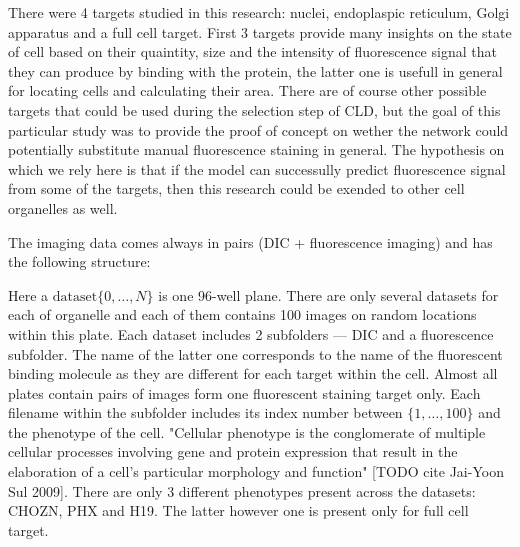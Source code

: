 There were 4 targets studied in this research: nuclei, endoplaspic reticulum, Golgi apparatus and a full cell target. First 3 targets provide many insights on the state of cell based on their quaintity, size and the intensity of fluorescence signal that they can produce by binding with the protein, the latter one is usefull in general for locating cells and calculating their area. There are of course other possible targets that could be used during the selection step of CLD, but the goal of this particular study was to provide the proof of concept on wether the network could potentially substitute manual fluorescence staining in general. The hypothesis on which we rely here is that if the model can successully predict fluorescence signal from some of the targets, then this research could be exended to other cell organelles as well.

The imaging data comes always in pairs (DIC + fluorescence imaging) and has the following structure:



Here a $\text{dataset}\{0, \ldots, N\}$ is one 96-well plane. There are only several datasets for each of organelle and each of them contains 100 images on random locations within this plate. Each dataset includes 2 subfolders --- DIC and a fluorescence subfolder. The name of the latter one corresponds to the name of the fluorescent binding molecule as they are different for each target within the cell. Almost all plates contain pairs of images form one fluorescent staining target only. Each filename within the subfolder includes its index number between $\{1, \ldots, 100\}$ and the phenotype of the cell. "Cellular phenotype is the conglomerate of multiple cellular processes involving gene and protein expression that result in the elaboration of a cell's particular morphology and function" [TODO cite Jai-Yoon Sul 2009]. There are only 3 different phenotypes present across the datasets: CHOZN, PHX and H19. The latter however one is present only for full cell target.

